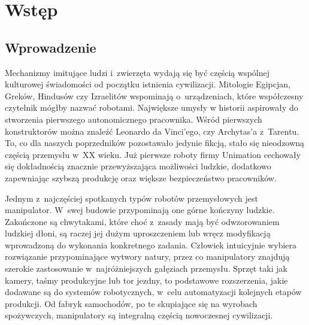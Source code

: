 
\chapter{Wstęp}
\label{chapter:wstep}
	
	
		\section{Wprowadzenie}
		\label{Wprowadzenie}
		Mechanizmy imitujące ludzi i~zwierzęta wydają się być częścią wspólnej kulturowej świadomości od początku istnienia cywilizacji. Mitologie Egipcjan, Greków, Hindusów czy Izraelitów wspominają o~urządzeniach, które współczesny czytelnik mógłby nazwać robotami. Największe umysły w historii aspirowały do stworzenia pierwszego autonomicznego pracownika. Wśród pierwszych konstruktorów można znaleźć Leonardo da Vinci'ego, czy Archytas'a z~Tarentu. To, co dla naszych poprzedników pozostawało jedynie fikcją, stało się nieodzowną częścią przemysłu w~XX wieku. Już pierwsze roboty firmy Unimation cechowały się dokładnością znacznie przewyższająca możliwości ludzkie, dodatkowo zapewniając szybszą produkcję oraz większe bezpieczeństwo pracowników. 
		
		Jednym z~najczęściej spotkanych typów robotów przemysłowych jest manipulator. W~swej budowie przypominają one górne kończyny ludzkie. Zakończone są chwytakami, które choć z~zasady mają być odwzorowaniem ludzkiej dłoni, są raczej jej dużym uproszczeniem lub wręcz modyfikacją wprowadzoną do wykonania konkretnego zadania. Człowiek intuicyjnie wybiera rozwiązanie przypominające wytwory natury, przez co manipulatory znajdują szerokie zastosowanie w~najróżniejszych gałęziach przemysłu.  Sprzęt taki jak kamery, taśmy produkcyjne lub tor jezdny, to podstawowe rozszerzenia, jakie dodawane są do systemów robotycznych, w~celu automatyzacji kolejnych etapów produkcji. Od fabryk samochodów, po te skupiające się na wyrobach spożywczych, manipulatory są integralną częścią nowoczesnej cywilizacji.

		
